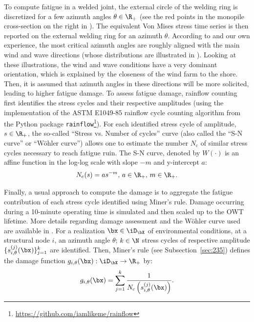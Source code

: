 To compute fatigue in a welded joint, the external circle of the welding ring is discretized for a few azimuth angles $\theta \in \R_+$ (see the red points in the monopile cross-section on the right in ). 
The equivalent Von Mises stress time series is then reported on the external welding ring for an azimuth $\theta$. 
According to \cite{li_zhan_2020} and our own experience, the most critical azimuth angles are roughly aligned with the main wind and wave directions (whose distributions are illustrated in ). 
Looking at these illustrations, the wind and wave conditions have a very dominant orientation, which is explained by the closeness of the wind farm to the shore. 
Then, it is assumed that azimuth angles in these directions will be more solicited, leading to higher fatigue damage. 
To assess fatigue damage, rainflow counting \citep{dowling_1972} first identifies the stress cycles and their respective amplitudes (using the implementation of the ASTM E1049-85 rainflow cycle counting algorithm from the Python package \texttt{rainflow}\footnote{\href{https://github.com/iamlikeme/rainflow}{https://github.com/iamlikeme/rainflow}}). 
For each identified stress cycle of amplitude, $s \in \R_+$, the so-called ``Stress vs. Number of cycles'' curve (also called the ``S-N curve'' or ``W\"ohler curve'') allows one to estimate the number $N_{\mathrm{c}}$ of similar stress cycles necessary to reach fatigue ruin. 
The S-N curve, denoted by $W(\cdot)$ is an affine function in the log-log scale with slope $-m$ and y-intercept $a$:
\begin{equation}
    N_{\mathrm{c}}(s) = a s^{-m}, \, a\in\R_+, \, m\in\R_+.
    \label{eq:wohler}
\end{equation}

Finally, a usual approach to compute the damage is to aggregate the fatigue contribution of each stress cycle identified using Miner’s rule. 
Damage occurring during a 10-minute operating time is simulated and then scaled up to the OWT lifetime. 
More details regarding damage assessment and the W\"ohler curve used are available in \citet[Sec. 2.4.6]{dnv_fatigue_2016}. 
For a realization $\bx \in \iD_{\bX}$ of environmental conditions, at a structural node $i$, an azimuth angle $\theta$; $k \in \N$ stress cycles of respective amplitude $\{s_{i, \theta}^{(j)}(\bx)\}_{j=1}^k$ are identified. 
Then, Miner's rule (see Subsection~\ref{sec:235}) defines the damage function $g_{i, \theta}(\bx): \iD_{\bX} \rightarrow \R_+$ by:
\begin{equation}
    g_{i, \theta}(\bx) = \sum_{j=1}^{k} \frac{1}{N_{\mathrm{c}}\left(s_{i, \theta}^{(j)}(\bx)\right)}.
    \label{eq:miner1}
\end{equation}

